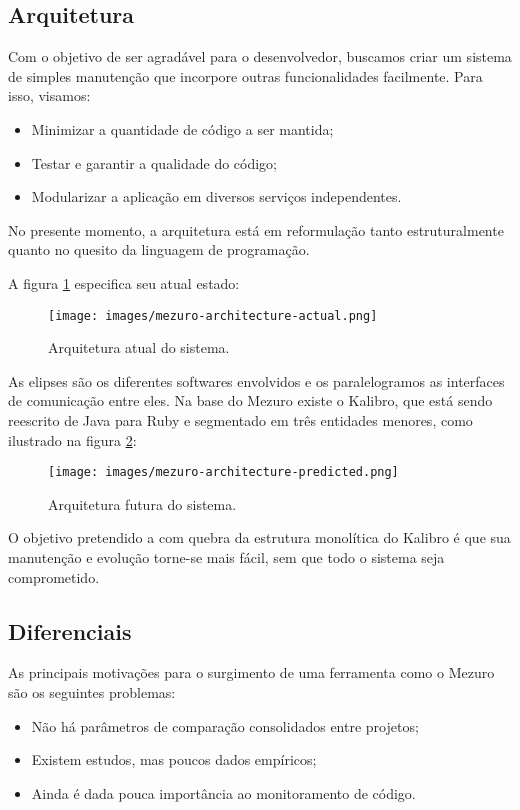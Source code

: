 \documentclass[12pt]{article}
\begin{document}
  \subsection{Arquitetura}
  Com o objetivo de ser agradável para o desenvolvedor, buscamos criar um sistema de simples manutenção que incorpore outras funcionalidades facilmente. Para isso, visamos:
  \begin{itemize}
    \item Minimizar a quantidade de código a ser mantida;
    \item Testar e garantir a qualidade do código;
    \item Modularizar a aplicação em diversos serviços independentes.
  \end{itemize}

  No presente momento, a arquitetura está em reformulação tanto estruturalmente quanto no quesito da linguagem de programação.

  A figura \ref{fig:architecture-1} especifica seu atual estado:
  \begin{figure}[H]
    \centering
    \texttt{[image: images/mezuro-architecture-actual.png]}
    \caption{Arquitetura atual do sistema.}
    \label{fig:architecture-1}
  \end{figure}
  As elipses são os diferentes softwares envolvidos e os paralelogramos as interfaces de comunicação entre eles. Na base do Mezuro existe o Kalibro, que está sendo reescrito
  de Java para Ruby e segmentado em três entidades menores, como ilustrado na figura \ref{fig:architecture-2}:
  \begin{figure}[H]
    \centering
      \texttt{[image: images/mezuro-architecture-predicted.png]}
    \caption{Arquitetura futura do sistema.}
    \label{fig:architecture-2}
  \end{figure}
  O objetivo pretendido a com quebra da estrutura monolítica do Kalibro é que sua manutenção e evolução torne-se mais fácil, sem que todo o sistema seja comprometido.

  \subsection{Diferenciais} \label{subsec:motivacao}
  As principais motivações para o surgimento de uma ferramenta como o Mezuro são os seguintes problemas:
  \begin{itemize}
      \item Não há parâmetros de comparação consolidados entre projetos;
      \item Existem estudos, mas poucos dados empíricos;
      \item Ainda é dada pouca importância ao monitoramento de código.
  \end{itemize}
\end{document}
